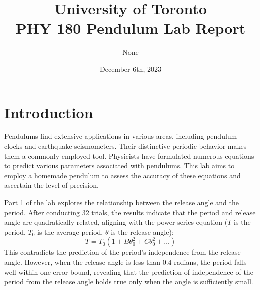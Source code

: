 \documentclass[11pt,titlepage,a4paper,twocolumn]{article}
\begin{document}
\title{University of Toronto \\ PHY 180 Pendulum Lab Report}
\author{None}
\date{December 6th, 2023}
\maketitle


\section{Introduction}
    \hspace{\parindent}\hspace{\parindent} Pendulums find extensive applications in various areas, including pendulum clocks and earthquake seismometers. Their distinctive periodic behavior makes them a commonly employed tool. Physicists have formulated numerous equations to predict various parameters associated with pendulums. This lab aims to employ a homemade pendulum to assess the accuracy of these equations and ascertain the level of precision.

    Part 1 of the lab explores the relationship between the release angle and the period. After conducting 32 trials, the results indicate that the period and release angle are quadratically related, aligning with the power series equation ($T$ is the period, $T_0$ is the average period, $\theta$ is the release angle):
    \begin{equation} 
    T = T_0(1 + B\theta_0^2 + C\theta_0^2 + \ldots) \label{eq:1}
    \end{equation}
    This contradicts the prediction of the period's independence from the release angle. However, when the release angle is less than 0.4 radians, the period falls well within one error bound, revealing that the prediction of independence of the period from the release angle holds true only when the angle is sufficiently small.
    
\end{document}
